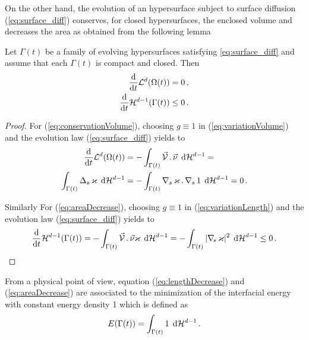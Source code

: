 On the other hand, the evolution of an hypersurface subject to surface
diffusion (\ref{eq:surface_diff}) conserves, for closed hypersurfaces, the
enclosed volume and decreases the area as obtained from the following
lemma

\begin{lemma}
Let $\Gamma(t)$ be a family of evolving hypersurfaces
satisfying \eqref{eq:surface_diff} and assume that each $\Gamma(t)$ is
compact and closed. Then
\begin{align}
\frac{\rm d}{{\rm d}t} \mathcal{L}^d(\Omega(t)) & = 0 \,, \label{eq:conservationVolume} \\
\frac{\rm d}{{\rm d}t} \mathcal{H}^{d-1} (\Gamma(t)) & \leq 0 \,.\label{eq:areaDecrease}
\end{align}
\end{lemma}

\begin{proof}
For (\ref{eq:conservationVolume}), choosing $g \equiv 1$ in
(\ref{eq:variationVolume}) and the evolution law (\ref{eq:surface_diff}) yields
to
\begin{align*}
\frac{\rm d}{{\rm d}t} \mathcal{L}^d(\Omega(t)) &= - \int_{\Gamma(t)} \vec{\mathcal{V}}\,.\,\vec\nu \,
\;{\rm d}{\cal H}^{d-1} = \nonumber \\
\int_{\Gamma(t)} \Delta_s \, \varkappa \, \;{\rm d}{\cal H}^{d-1} &= - \int_{\Gamma(t)}
\nabla_s \, \varkappa \,.\, \nabla_s \, 1 \, \;{\rm d}{\cal H}^{d-1}= 0 \,.
\end{align*}

Similarly For (\ref{eq:areaDecrease}), choosing $g \equiv 1$ in
(\ref{eq:variationLength}) and the evolution law (\ref{eq:surface_diff}) yields
to
\begin{equation*}
\frac{\rm d}{{\rm d}t} \mathcal{H}^{d-1}(\Gamma(t)) = - \int_{\Gamma(t)} \vec{\mathcal{V}}\,.\,\vec\nu
\varkappa \, \;{\rm d}{\cal H}^{d-1} = - \int_{\Gamma(t)} |\nabla_{\!s} \, \varkappa|^2 \, \;{\rm d}{\cal H}^{d-1}
\leq 0 \,.
\end{equation*}
\end{proof}

From a physical point of view, equation (\ref{eq:lengthDecrease}) and
(\ref{eq:areaDecrease}) are associated to the minimization of the interfacial
energy with constant energy density 1 which is defined as
\begin{equation}
E(\Gamma(t)) = \int_{\Gamma(t)} 1 \, \;{\rm d}{\cal H}^{d-1} \, .
\end{equation}

